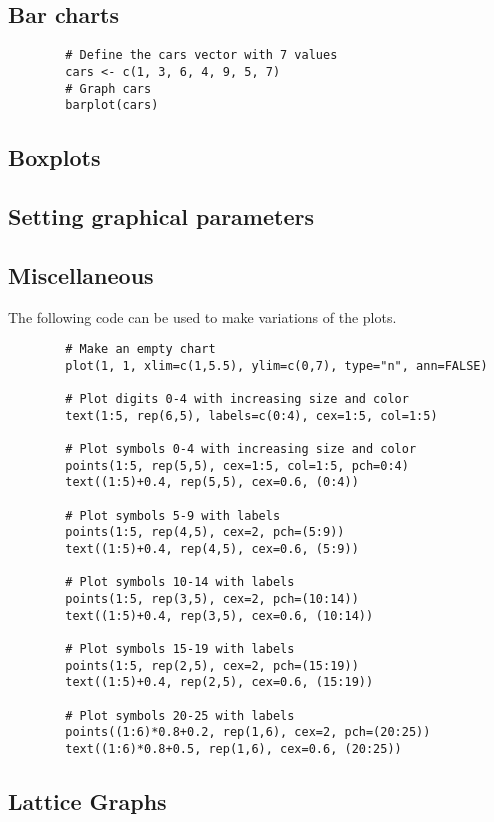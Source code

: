 \documentclass[a4paper,12pt]{article}
\begin{document}
	\subsection{Bar charts}
	\begin{framed}
		\begin{verbatim}
		# Define the cars vector with 7 values
		cars <- c(1, 3, 6, 4, 9, 5, 7)
		# Graph cars
		barplot(cars)
		\end{verbatim}
	\end{framed}
	\subsection{Boxplots}
	\subsection{Setting graphical parameters}
	\subsection{Miscellaneous}
	The following code can be used to make variations of the plots.
	
	\begin{framed}
		\large \begin{verbatim}
		# Make an empty chart
		plot(1, 1, xlim=c(1,5.5), ylim=c(0,7), type="n", ann=FALSE)
		
		# Plot digits 0-4 with increasing size and color
		text(1:5, rep(6,5), labels=c(0:4), cex=1:5, col=1:5)
		
		# Plot symbols 0-4 with increasing size and color
		points(1:5, rep(5,5), cex=1:5, col=1:5, pch=0:4)
		text((1:5)+0.4, rep(5,5), cex=0.6, (0:4))
		
		# Plot symbols 5-9 with labels
		points(1:5, rep(4,5), cex=2, pch=(5:9))
		text((1:5)+0.4, rep(4,5), cex=0.6, (5:9))
		
		# Plot symbols 10-14 with labels
		points(1:5, rep(3,5), cex=2, pch=(10:14))
		text((1:5)+0.4, rep(3,5), cex=0.6, (10:14))
		
		# Plot symbols 15-19 with labels
		points(1:5, rep(2,5), cex=2, pch=(15:19))
		text((1:5)+0.4, rep(2,5), cex=0.6, (15:19))
		
		# Plot symbols 20-25 with labels
		points((1:6)*0.8+0.2, rep(1,6), cex=2, pch=(20:25))
		text((1:6)*0.8+0.5, rep(1,6), cex=0.6, (20:25))
		\end{verbatim}\large
	\end{framed}
	
	\subsection{Lattice Graphs}
\end{document}
